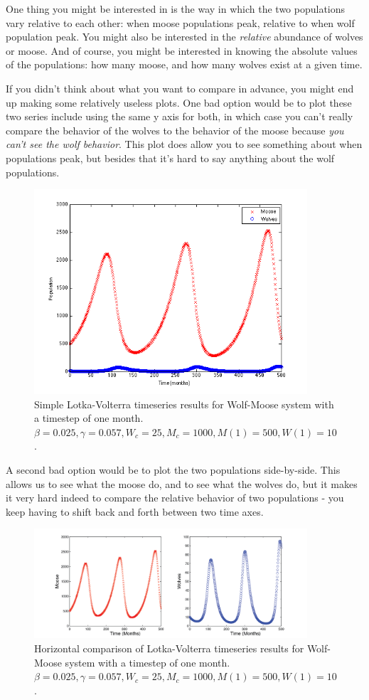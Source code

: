 \documentclass{tufte-handout}
\begin{document}
One thing you might be interested in is the way in which the two populations vary relative to each other:  when moose populations peak, relative to when wolf population peak.  You might also be interested in the {\it relative} abundance of wolves or moose.  And of course, you might be interested in knowing the absolute values of the populations:  how many moose, and how many wolves exist at a given time.

If you didn't think about what you want to compare in advance, you might end up making some relatively useless plots.  One bad option would be to plot these two series include using the same y axis for both, in which case you can't really compare the behavior of the wolves to the behavior of the moose because {\it you can't see the wolf behavior}.   This plot does allow you to see something about when populations peak, but besides that it's hard to say anything about the wolf populations.

\begin{figure}[h!]
\includegraphics[width=4in]{figs/WolfMooseTImeSeries}
\caption{Simple Lotka-Volterra timeseries results for Wolf-Moose system with a timestep of one month.  $\beta = 0.025, \gamma = 0.057, W_c = 25, M_c=1000, M(1) = 500, W(1) = 10$.}
\end{figure}

A second bad option would be to plot the two populations side-by-side.  This allows us to see what the moose do, and to see what the wolves do, but it makes it very hard indeed to compare the relative behavior of two populations - you keep having to shift back and forth between two time axes.

\begin{figure}[h!]
\includegraphics[width=4in]{figs/WolfMooseTImeSeriesHorizontal}
\caption{Horizontal comparison of Lotka-Volterra timeseries results for Wolf-Moose system with a timestep of one month.  $\beta = 0.025, \gamma = 0.057, W_c = 25, M_c=1000, M(1) = 500, W(1) = 10$.}
\end{figure}
\end{document}
